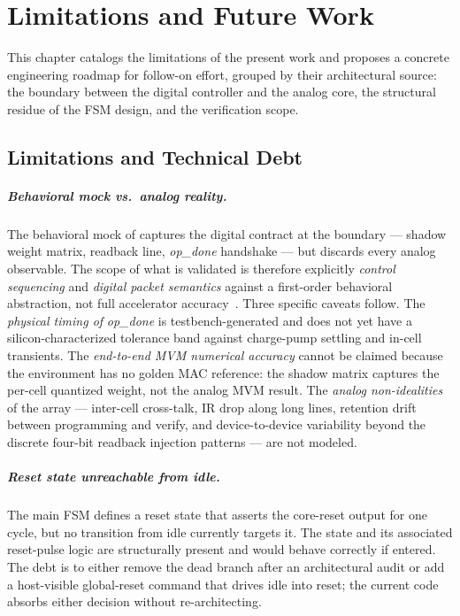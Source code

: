 
\chapter{Limitations and Future Work}
\label{ch:limitations}

This chapter catalogs the limitations of the present work and proposes
a concrete engineering roadmap for follow-on effort, grouped by their
architectural source: the boundary between the digital controller and
the analog core, the structural residue of the FSM design, and the
verification scope.

\section{Limitations and Technical Debt}
\label{sec:lim-limitations}

\paragraph{Behavioral mock vs.\ analog reality.}
The behavioral mock of  captures the digital
contract at the boundary --- shadow weight matrix, readback line,
\emph{op\_done} handshake --- but discards every analog observable. The
scope of what is validated is therefore explicitly \emph{control
sequencing} and \emph{digital packet semantics} against a first-order
behavioral abstraction, not full accelerator
accuracy~\cite{Ielmini2018RRAM, Sebastian2020IMC}. Three specific
caveats follow. The \emph{physical timing of} \emph{op\_done} is
testbench-generated and does not yet have a silicon-characterized
tolerance band against charge-pump settling and in-cell transients. The
\emph{end-to-end MVM numerical accuracy} cannot be claimed because the
environment has no golden MAC reference: the shadow matrix captures the
per-cell quantized weight, not the analog MVM result. The
\emph{analog non-idealities} of the array --- inter-cell cross-talk, IR
drop along long lines, retention drift between programming and verify,
and device-to-device variability beyond the discrete four-bit readback
injection patterns --- are not modeled.

\paragraph{Reset state unreachable from idle.}
The main FSM defines a reset state that asserts the core-reset output
for one cycle, but no transition from idle currently targets it. The
state and its associated reset-pulse logic are structurally present and
would behave correctly if entered. The debt is to either remove the
dead branch after an architectural audit or add a host-visible
global-reset command that drives idle into reset; the current code
absorbs either decision without re-architecting.

